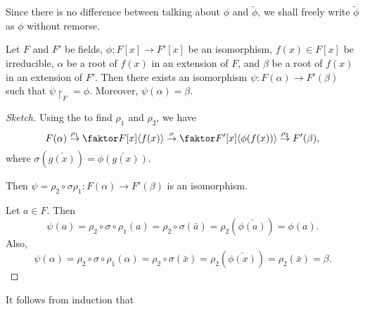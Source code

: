 \documentclass[notoc,notitlepage,nobib]{tufte-book}
\begin{document}
\begin{note}
  Since there is no difference between talking about $\phi$ and $\tilde{\phi}$, we shall
  freely write $\tilde{\phi}$ as $\phi$ without remorse.
\end{note}

\begin{lemma}\label{lemma:isomorphism_extension_lemma}
  Let $F$ and $F'$ be fields, $\phi : F[x] \to F'[x]$ be an isomorphism, $f(x) \in F[x]$ be
  irreducible, $\alpha$ be a root of $f(x)$ in an extension of $F$, and $\beta$ be a root of
  $f(x)$ in an extension of $F'$. Then there exists an isomorphism
  $\psi : F(\alpha) \to F'(\beta)$ such that $\psi \restriction_F = \phi$. Moreover,
  $\psi(\alpha) = \beta$.
\end{lemma}

\begin{proof}[Sketch]
  Using the  to find $\rho_1$ and $\rho_2$, we have
  \begin{equation*}
    F(\alpha) \overset{\rho_1}{\to} \quotient{F[x]}{\langle f(x) \rangle}
    \overset{\sigma}{\to} \quotient{F'[x]}{\langle \phi(f(x)) \rangle}
    \overset{\rho_2}{\to} F'(\beta),
  \end{equation*}
   where $\sigma(\bar{g(x)}) = \bar{\phi(g(x))}$. 
  
  Then $\psi = \rho_2 \circ \sigma \rho_1 : F(\alpha) \to F'(\beta)$ is an isomorphism.

  Let $a \in F$. Then
  \begin{equation*}
    \psi(a) = \rho_2 \circ \sigma \circ \rho_1 (a) = \rho_2 \circ \sigma(\bar{a}) 
      = \rho_2(\bar{\phi(a)}) = \phi(a).
  \end{equation*}
  Also,
  \begin{equation*}
    \psi(\alpha) = \rho_2 \circ \sigma \circ \rho_1(\alpha) = \rho_2 \circ \sigma(\bar{x}) 
      = \rho_2(\bar{\phi(x)}) = \rho_2(\bar{x}) = \beta.
  \end{equation*}
\end{proof}

It follows from induction that
\end{document}
